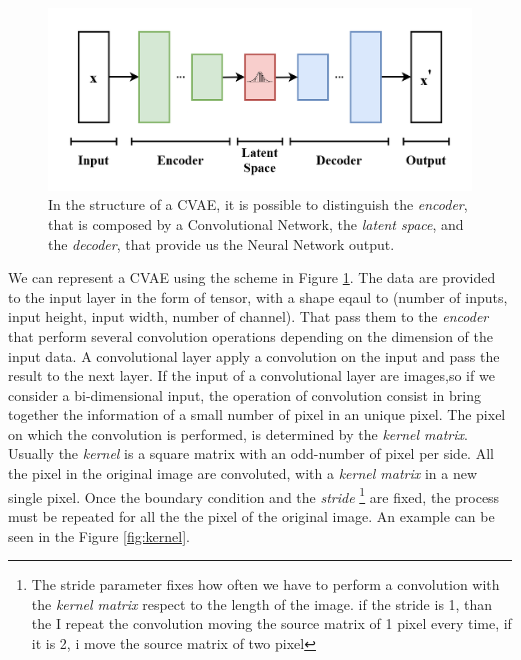 \documentclass[12pt,a4paper,twocolumn]{article}
\begin{document}
			
			\begin{figure}[h!] 
				\centering
				\includegraphics[width=1\linewidth]{images/VAE_Basic}
				\caption{In the structure of a CVAE, it is possible to distinguish the \emph{encoder}, that is composed by a Convolutional Network, the \emph{ latent space}, and the \emph{decoder}, that provide us the Neural Network output.}
				\label{fig:vaebasic}
			\end{figure}
			We can represent a CVAE using the scheme in Figure \ref{fig:vaebasic}. The data are provided to the input layer in the form of tensor, with a shape eqaul to (number of inputs, input height, input width, number of channel). That pass them to the \emph{encoder} that perform several convolution operations depending on the dimension of the input data. A convolutional layer apply a convolution on the input and pass the result to the next layer. If the input of a convolutional layer are images,so if we consider a bi-dimensional input, the operation of convolution consist in bring together the information of a small number of pixel in an unique pixel. The pixel on which the convolution is performed, is determined by the \emph{kernel matrix}. Usually the \emph{kernel} is a square matrix with an odd-number of pixel per side. All the pixel in the original image are convoluted, with a \emph{kernel matrix} in a new single pixel. Once the boundary condition and the \emph{stride} \footnote{The stride parameter fixes how often we have to perform a convolution with the \emph{kernel matrix} respect to the length of the image. if the stride is 1, than the I repeat the convolution moving the source matrix of 1 pixel every time, if it is 2, i move the source matrix of two pixel} are fixed, the process must be repeated for all the the pixel of the original image. An example can be seen in the Figure \ref{fig:kernel}. 
		
\end{document}

